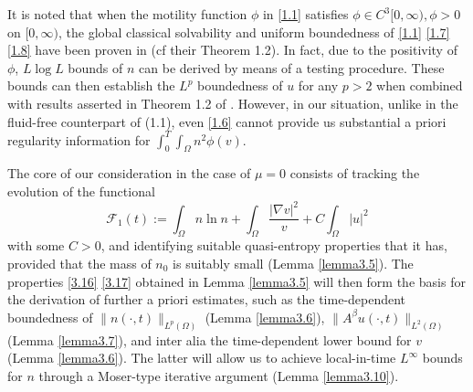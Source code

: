 \documentclass[12pt]{article}
\theoremstyle{plain}
\theoremstyle{definition}
\numberwithin{equation}{section}
\begin{document}
It is noted that when the motility function $\phi$ in \eqref{1.1} satisfies
$\phi\in  C^3[0,\infty), \phi>0$ on $[0,\infty)$, the global classical solvability and uniform boundedness of \eqref{1.1} \eqref{1.7} \eqref{1.8} have been proven in
\cite{Winklerpreprint} (cf their Theorem 1.2).  In fact,
due to the positivity of $\phi$, $L\log L$ bounds of $n$ can be derived by means of  a testing procedure.
These bounds can then establish the $L^p$ boundedness of $u$ for any $p>2$ when combined with results asserted in Theorem 1.2 of \cite{Winklerpreprint}.
However, in our situation, unlike in the fluid-free counterpart of (1.1), even \eqref{1.6} cannot provide us substantial a priori regularity information for
   $ \int^T_0\int_{\Omega} n^2 \phi(v)$.

The core of our consideration in the case of $\mu=0$  consists of
   tracking the evolution of the functional
  \begin{equation}\label{1.14}
  \mathcal{F}_1(t):=\int_\Omega n\ln n+ \int_\Omega  \frac{|\nabla v|^2}v+C\int_\Omega |u|^2
\end{equation}
 with some $C>0$, and identifying suitable quasi-entropy properties that it has, provided that the mass of  $n_0$ is suitably small
 (Lemma \ref{lemma3.5}). The properties \eqref{3.16} \eqref{3.17} obtained in Lemma \ref{lemma3.5}
will then form the basis for the derivation of further a priori estimates, such as the time-dependent boundedness of
$\|n(\cdot,t)\|_{L^p(\Omega)} $ (Lemma \ref{lemma3.6}), $\|A^\beta u(\cdot,t)\|_{L^2(\Omega)}$ (Lemma \ref{lemma3.7}), and inter alia
 the time-dependent lower bound for $v$ (Lemma \ref{lemma3.6}). The latter will allow us to achieve local-in-time $L^\infty$ bounds for $n$ through a Moser-type iterative argument (Lemma \ref{lemma3.10}).
\end{document}
